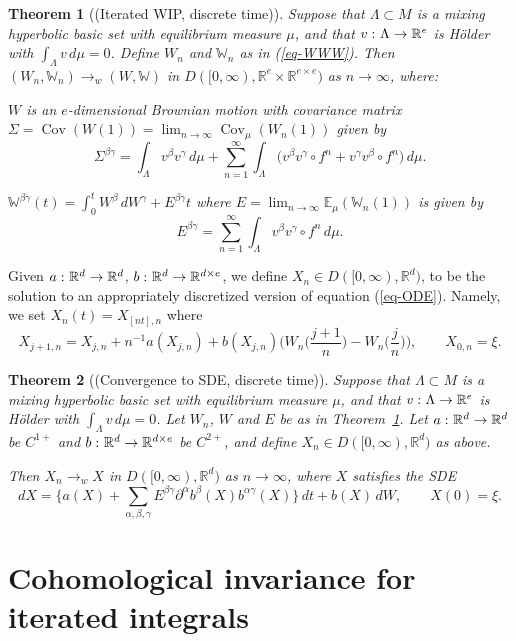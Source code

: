 \documentclass[aop,MSNbibl,seceqn,dvips]{arximspdf}
\newcommand{\eqref}[1]{(\ref{#1})}
\newtheorem{thmm}{Theorem}[section]
\newcommand{\R}{\mathbb{R}}
\newcommand{\E}{\mathbb{E}}
\newcommand{\BBW}{\mathbb{W}}
\newcommand{\Cov}{\operatorname{Cov}}
\begin{document}
\begin{thmm}[(Iterated WIP, discrete time)] \label{thmm-WW2}
Suppose that $\Lambda\subset M$ is a mixing hyperbolic basic set with
equilibrium measure $\mu$, and that $v\dvtx\Lambda\to\R^e$ is H\"
older with
$\int_\Lambda v \,d\mu=0$.
Define $W_n$ and $\BBW_n$ as in \eqref{eq-WWW}.
Then
$(W_n,\BBW_n)\to_w (W,\BBW)$ in $D([0,\infty),\R^e\times\R
^{e\times e})$
as $n\to\infty$, where:
%
\begin{longlist}[(ii)]
%
\item[(i)]
$W$ is an $e$-dimensional
Brownian motion with covariance matrix $\Sigma=\Cov(W(1))=\lim_{n\to
\infty}\Cov_\mu(W_n(1))$ given by
%
\[
\Sigma^{\beta\gamma}  =\int_\Lambda v^\beta
v^\gamma \,d\mu+ \sum_{n=1}^\infty
\int_\Lambda\bigl(v^\beta v^\gamma\circ
f^n+ v^\gamma v^\beta\circ f^n\bigr) \,d
\mu.
\]
%
\item[(ii)]
$\BBW^{\beta\gamma}(t)=\int_0^t W^\beta \,dW^\gamma+ E^{\beta\gamma
}t$ where
$E=\lim_{n\to\infty} \E_\mu(\BBW_n(1))$ is given by
%
\[
E^{\beta\gamma}= \sum_{n=1}^\infty\int
_\Lambda v^\beta v^\gamma \circ
f^n \,d\mu.
\]
%
\end{longlist}
%
\end{thmm}

Given $a\dvtx\R^d\to\R^d$, $b\dvtx\R^d\to\R^{d\times e}$, we define
$X_n\in D([0,\infty),\R^d)$, to be the solution to an appropriately
discretized version of equation \eqref{eq-ODE}.
Namely, we set
$X_n(t)=X_{[nt],n}$ where
%
\[
X_{j+1,n}=X_{j,n}+n^{-1}a(X_{j,n})+b(X_{j,n})
\biggl(W_n\biggl({\frac
{j+1}{n}}\biggr)-W_n\biggl({
\frac{j}{n}}\biggr) \biggr),\qquad X_{0,n}=\xi.
\]

\begin{thmm}[(Convergence to SDE, discrete time)] \label{thmm-approx2}
Suppose that $\Lambda\subset M$ is a mixing hyperbolic basic set with
equilibrium measure $\mu$, and that $v\dvtx\Lambda\to\R^e$ is H\"
older with
$\int_\Lambda v \,d\mu=0$.
Let $W_n$, $W$ and $E$ be as in Theorem~\ref{thmm-WW2}.
Let $a\dvtx\R^d\to\R^d$ be $C^{1+}$ and $b\dvtx\R^d\to\R
^{d\times e}$ be
$C^{2+}$, and define
$X_n\in D([0,\infty),\R^d)$ as above.

Then $X_n\to_w X$ in $D([0,\infty),\R^d)$ as $n\to\infty$, where $X$
satisfies the SDE
%
\[
dX= \biggl\{a(X)+\sum_{\alpha,\beta,\gamma}E^{\beta\gamma
}
\partial^\alpha b^{\beta}(X) b^{ \alpha\gamma}(X) \biggr\} \,dt+b(X)
\,dW, \qquad X(0)=\xi.
\]
%
\end{thmm}

\section{Cohomological invariance for iterated integrals}
\label{sec-cohom}
\end{document}
